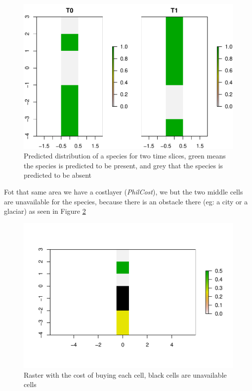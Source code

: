 \documentclass[]{article}
\begin{document}
\begin{figure}
\centering
\includegraphics{Ideas2_files/figure-latex/PhilDist-1.pdf}
\caption{\label{fig:PhilDist}Predicted distribution of a species for two time slices, green means the species is predicted to be present, and grey that the species is predicted to be absent}
\end{figure}

Fot that same area we have a costlayer (\emph{PhilCost}), we but the two middle cells are unavailable for the species, because there is an obstacle there (eg: a city or a glaciar) as seen in Figure \ref{fig:Cost}

\begin{figure}
\centering
\includegraphics{Ideas2_files/figure-latex/Cost-1.pdf}
\caption{\label{fig:Cost}Raster with the cost of buying each cell, black cells are unavailable cells}
\end{figure}
\end{document}
